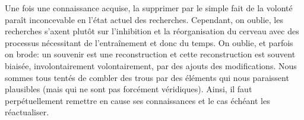                 Une fois une connaissance acquise, la supprimer par le simple fait de la volonté paraît inconcevable en l’état actuel des recherches. Cependant, on oublie, les recherches s'axent plutôt sur l’inhibition et la réorganisation du cerveau avec des processus nécessitant de l’entraînement et donc du temps.
                On oublie, et parfois on brode: un souvenir est une reconstruction et cette reconstruction est souvent biaisée, involontairement \etou volontairement, par des ajouts \etou des modifications. Nous sommes tous tentés de combler des trous par des éléments qui nous paraissent plausibles (mais qui ne sont pas forcément véridiques). Ainsi, il faut perpétuellement remettre en cause ses connaissances et le cas échéant les réactualiser.
